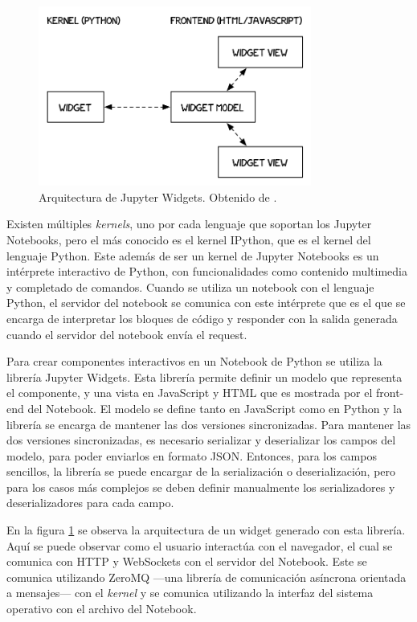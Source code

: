 \begin{figure}[h]
    \centering
    \includegraphics[width=0.8\textwidth]{imagenes/notebook/WidgetModelView}
    \caption[Arquitectura de Jupyter Widgets]{Arquitectura de Jupyter Widgets. Obtenido de \cite{arq-widget}.}
    \label{fig:widget_arq}
\end{figure}

Existen múltiples \textit{kernels}, uno por cada lenguaje que soportan los Jupyter Notebooks, pero el más conocido es el kernel IPython, que es el kernel del lenguaje Python. Este además de ser un kernel de Jupyter Notebooks es un intérprete interactivo de Python, con funcionalidades como contenido multimedia y completado de comandos. Cuando se utiliza un notebook con el lenguaje Python, el servidor del notebook se comunica con este intérprete que es el que se encarga de interpretar los bloques de código y responder con la salida generada cuando el servidor del notebook envía el request.

Para crear componentes interactivos en un Notebook de Python se utiliza la librería Jupyter Widgets. Esta librería permite definir un modelo que representa el componente, y una vista en JavaScript y HTML que es mostrada por el front-end del Notebook. El modelo se define tanto en JavaScript como en Python y la librería se encarga de mantener las dos versiones sincronizadas. Para mantener las dos versiones sincronizadas, es necesario serializar y deserializar los campos del modelo, para poder enviarlos en formato JSON. Entonces, para los campos sencillos, la librería se puede encargar de la serialización o deserialización, pero para los casos más complejos se deben definir manualmente los serializadores y deserializadores para cada campo. 

En la figura \ref{fig:widget_arq} se observa la arquitectura de un widget generado con esta librería. Aquí se puede observar como el usuario interactúa con el navegador, el cual se comunica con HTTP y WebSockets con el servidor del Notebook. Este se comunica utilizando ZeroMQ ---una librería de comunicación asíncrona orientada a mensajes--- con el \textit{kernel} y se comunica utilizando la interfaz del sistema operativo con el archivo del Notebook.

